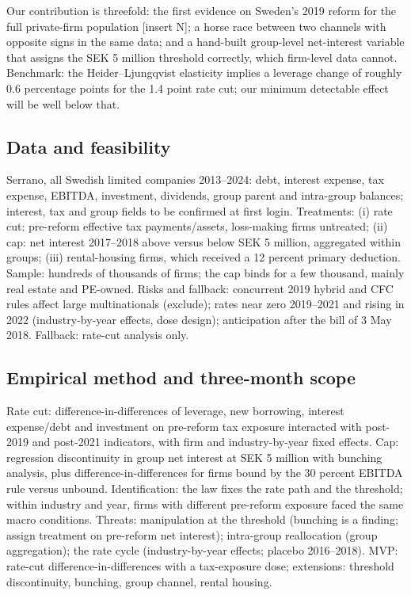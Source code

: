 \documentclass[12pt,a4paper]{article}
\begin{document}
Our contribution is threefold: the first evidence on Sweden's 2019 reform for the full private-firm population [insert N]; a horse race between two channels with opposite signs in the same data; and a hand-built group-level net-interest variable that assigns the SEK 5 million threshold correctly, which firm-level data cannot. Benchmark: the Heider--Ljungqvist elasticity implies a leverage change of roughly 0.6 percentage points for the 1.4 point rate cut; our minimum detectable effect will be well below that.

\subsection{Data and feasibility}

Serrano, all Swedish limited companies 2013--2024: debt, interest expense, tax expense, EBITDA, investment, dividends, group parent and intra-group balances; interest, tax and group fields to be confirmed at first login. Treatments: (i) rate cut: pre-reform effective tax payments/assets, loss-making firms untreated; (ii) cap: net interest 2017--2018 above versus below SEK 5 million, aggregated within groups; (iii) rental-housing firms, which received a 12 percent primary deduction. Sample: hundreds of thousands of firms; the cap binds for a few thousand, mainly real estate and PE-owned. Risks and fallback: concurrent 2019 hybrid and CFC rules affect large multinationals (exclude); rates near zero 2019--2021 and rising in 2022 (industry-by-year effects, dose design); anticipation after the bill of 3 May 2018. Fallback: rate-cut analysis only.

\subsection{Empirical method and three-month scope}

Rate cut: difference-in-differences of leverage, new borrowing, interest expense/debt and investment on pre-reform tax exposure interacted with post-2019 and post-2021 indicators, with firm and industry-by-year fixed effects. Cap: regression discontinuity in group net interest at SEK 5 million with bunching analysis, plus difference-in-differences for firms bound by the 30 percent EBITDA rule versus unbound. Identification: the law fixes the rate path and the threshold; within industry and year, firms with different pre-reform exposure faced the same macro conditions. Threats: manipulation at the threshold (bunching is a finding; assign treatment on pre-reform net interest); intra-group reallocation (group aggregation); the rate cycle (industry-by-year effects; placebo 2016--2018). MVP: rate-cut difference-in-differences with a tax-exposure dose; extensions: threshold discontinuity, bunching, group channel, rental housing.
\end{document}
